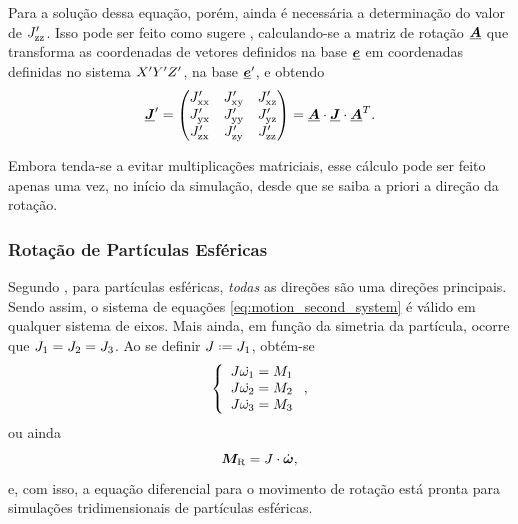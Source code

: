 Para a solução dessa equação, porém, ainda é necessária a determinação do valor de \(J_{\text{zz}}^\prime\). Isso pode ser feito como sugere , calculando-se a matriz de rotação \(\underline{\bm{A}}\) que transforma as coordenadas de vetores definidos na base \(\underline{\bm{e}}\) em coordenadas definidas no sistema \(X^\prime Y^\prime Z^\prime\), na base \(\underline{\bm{e}}^\prime\), e obtendo
\begin{equation*}
	\underline{\bm{J}}^\prime =
	\begin{pmatrix}
		J_{\text{xx}}^\prime & J_{\text{xy}}^\prime & J_{\text{xz}}^\prime \\
		J_{\text{yx}}^\prime & J_{\text{yy}}^\prime & J_{\text{yz}}^\prime \\
		J_{\text{zx}}^\prime & J_{\text{zy}}^\prime & J_{\text{zz}}^\prime
	\end{pmatrix}
	=
	\underline{\bm{A}}\cdot \underline{\bm{J}} \cdot {\underline{\bm{A}}}^T.
\end{equation*}

Embora tenda-se a evitar multiplicações matriciais, esse cálculo pode ser feito apenas uma vez, no início da simulação, desde que se saiba a priori a direção da rotação.

\subsubsection{Rotação de Partículas Esféricas} \label{subsubsec:rotation_of_spherical_particles}

Segundo , para partículas esféricas, \textit{todas} as direções são uma direções principais. Sendo assim, o sistema de equações \eqref{eq:motion_second_system} é válido em qualquer sistema de eixos. Mais ainda, em função da simetria da partícula, ocorre que \(J_1 = J_2 = J_3\). Ao se definir \(\momentOfInertia \eqdef \momentOfInertia_1\), obtém-se
\begin{equation*}
	\left\lbrace
	\begin{array}{l}
		\momentOfInertia\deriv{1}{\angularVelocityScalar_1} = \torqueScalar_1 \\
		\momentOfInertia\deriv{1}{\angularVelocityScalar_2} = \torqueScalar_2 \\
		\momentOfInertia\deriv{1}{\angularVelocityScalar_3} = \torqueScalar_3
	\end{array}
	\right.
	,
\end{equation*}
ou ainda
\begin{equation} \label{eq:rotation_spherical_particle}
	\resultingTorque = \momentOfInertia\cdot\angularAcceleration,
\end{equation}
e, com isso, a equação diferencial para o movimento de rotação está pronta para simulações tridimensionais de partículas esféricas.

